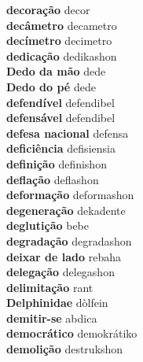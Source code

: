 \textbf{ decoração  } decor \\
\textbf{ decâmetro  } decametro \\
\textbf{ decímetro  } decimetro \\
\textbf{ dedicação  } dedikashon \\
\textbf{ Dedo da mão  } dede \\
\textbf{ Dedo do pé  } dede \\
\textbf{ defendível  } defendibel \\
\textbf{ defensável  } defendibel \\
\textbf{ defesa nacional  } defensa \\
\textbf{ deficiência  } defisiensia \\
\textbf{ definição  } definishon \\
\textbf{ deflação  } deflashon \\
\textbf{ deformação  } deformashon \\
\textbf{ degeneração  } dekadente \\
\textbf{ deglutição  } bebe \\
\textbf{ degradação  } degradashon \\
\textbf{ deixar de lado  } rebaha \\
\textbf{ delegação  } delegashon \\
\textbf{ delimitação  } rant \\
\textbf{ Delphinidae  } dòlfein \\
\textbf{ demitir-se  } abdica \\
\textbf{ democrático  } demokrátiko \\
\textbf{ demolição  } destrukshon \\

